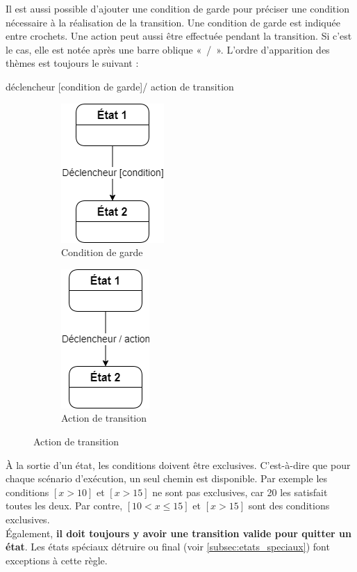 Il est aussi possible d'ajouter une condition de garde  pour préciser une condition nécessaire à la réalisation de la transition. Une condition de garde est indiquée entre crochets. Une action peut aussi être effectuée pendant la transition. Si c'est le cas, elle est notée après une barre oblique «~/~». L'ordre d'apparition des thèmes est toujours le suivant :

\begin{center}
	déclencheur [condition de garde]/ action de transition
\end{center}

\begin{figure}[H]
	\caption{Représentation des conditions de garde et des actions de transition dans un \acrshort{DET}}
	\centering
	\hfill
	\begin{subfigure}[b]{0.3\textwidth}
		\centering
		\includegraphics[scale=.45]{transition-condition.png}
		\caption*{Condition de garde}
	\end{subfigure}
	\hfill
	\begin{subfigure}[b]{0.3\textwidth}
		\centering
		\includegraphics[scale=.45]{transition-action.png}
		\caption*{Action de transition}
	\end{subfigure}
	\hfill
\end{figure}

\begin{important}
	À la sortie d'un état, les conditions doivent être exclusives. C'est-à-dire que pour chaque scénario d'exécution, un seul chemin est disponible. Par exemple les conditions $[x > 10]$ et $[x > 15]$ ne sont pas exclusives, car 20 les satisfait toutes les deux. Par contre, $[10 < x \leq 15]$ et $[x > 15]$ sont des conditions exclusives.\\
	
	Également, {\bfseries il doit toujours y avoir une transition valide pour quitter un état}. Les états spéciaux détruire ou final (voir \ref{subsec:etats_speciaux}) font exceptions à cette règle.
\end{important}

